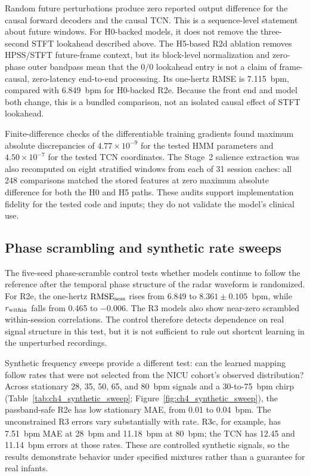 Random future perturbations produce zero reported output difference for the causal forward
decoders and the causal TCN. This is a sequence-level statement about future windows. For
H0-backed models, it does not remove the three-second STFT lookahead described above. The
H5-based R2d ablation removes HPSS/STFT future-frame context, but its block-level normalization
and zero-phase outer bandpass mean that the $0/0$ lookahead entry is not a claim of frame-causal,
zero-latency end-to-end processing. Its one-hertz RMSE is 7.115~bpm, compared with 6.849~bpm for
H0-backed R2e. Because the front end and model both change, this is a bundled comparison, not an
isolated causal effect of STFT lookahead.

Finite-difference checks of the differentiable training gradients found maximum absolute
discrepancies of $4.77\times10^{-9}$ for the tested HMM parameters and
$4.50\times10^{-7}$ for the tested TCN coordinates. The Stage~2 salience extraction was also
recomputed on eight stratified windows from each of 31 session caches: all 248 comparisons
matched the stored features at zero maximum absolute difference for both the H0 and H5 paths.
These audits support implementation fidelity for the tested code and inputs; they do not
validate the model's clinical use.

\subsection{Phase scrambling and synthetic rate sweeps}
\label{sec:ch4_synthetic}

The five-seed phase-scramble control tests whether models continue to follow the reference after
the temporal phase structure of the radar waveform is randomized. For R2e, the one-hertz
$\mathrm{RMSE}_{\mathrm{sess}}$ rises from 6.849 to $8.361\pm0.105$~bpm, while $r_{\mathrm{within}}$ falls from 0.465 to
$-0.006$. The R3 models also show near-zero scrambled within-session correlations. The control
therefore detects dependence on real signal structure in this test, but it is not sufficient to
rule out shortcut learning in the unperturbed recordings.

Synthetic frequency sweeps provide a different test: can the learned mapping follow rates that
were not selected from the NICU cohort's observed distribution? Across stationary 28, 35, 50,
65, and 80~bpm signals and a 30-to-75~bpm chirp (Table~\ref{tab:ch4_synthetic_sweep};
Figure~\ref{fig:ch4_synthetic_sweep}), the passband-safe R2e has low stationary MAE, from 0.01
to 0.04~bpm. The unconstrained R3 errors vary substantially with rate. R3c,
for example, has 7.51~bpm MAE at 28~bpm and 11.18~bpm at 80~bpm; the TCN has 12.45 and
11.14~bpm errors at those rates. These are controlled synthetic signals, so the results
demonstrate behavior under specified mixtures rather than a guarantee for real infants.

